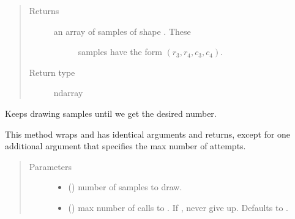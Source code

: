 \documentclass[letterpaper,10pt,english]{sphinxmanual}
\begin{document}
\begin{fulllineitems}
\begin{fulllineitems}
\begin{quote}
\begin{description}
\begin{itemize}
\end{itemize}

\item[{Returns}] \leavevmode
\begin{description}
\item[{an array of samples of shape . These}] \leavevmode
samples have the form \((r_3, r_4, c_3, c_4)\).

\end{description}


\item[{Return type}] \leavevmode
ndarray

\end{description}\end{quote}

\end{fulllineitems}


\begin{fulllineitems}
\label{\detokenize{code_structure:scdc.initial.distribution.integral.InitialSampler.sample}}
Keeps drawing samples until we get the desired number.

This method wraps  and has identical arguments and returns,
except for one additional argument that specifies the max number of
attempts.
\begin{quote}\begin{description}
\item[{Parameters}] \leavevmode\begin{itemize}
\item {} 
 () \textendash{} number of samples to draw.

\item {} 
 () \textendash{} max number of calls to . If
, never give up. Defaults to .

\end{itemize}


\end{description}
\end{quote}
\end{fulllineitems}
\end{fulllineitems}
\end{document}
